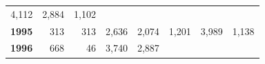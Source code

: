 \documentclass[]{article}
\begin{document}
\begin{longtable}[]{@{}rrrrrrrr@{}}
\begin{minipage}[t]{0.09\columnwidth}
4,112\strut
\end{minipage} & \begin{minipage}[t]{0.08\columnwidth}\raggedleft\strut
2,884\strut
\end{minipage} & \begin{minipage}[t]{0.10\columnwidth}\raggedleft\strut
1,102\strut
\end{minipage}\tabularnewline
\begin{minipage}[t]{0.08\columnwidth}\raggedleft\strut
\textbf{1995}\strut
\end{minipage} & \begin{minipage}[t]{0.10\columnwidth}\raggedleft\strut
313\strut
\end{minipage} & \begin{minipage}[t]{0.11\columnwidth}\raggedleft\strut
313\strut
\end{minipage} & \begin{minipage}[t]{0.08\columnwidth}\raggedleft\strut
2,636\strut
\end{minipage} & \begin{minipage}[t]{0.14\columnwidth}\raggedleft\strut
2,074\strut
\end{minipage} & \begin{minipage}[t]{0.09\columnwidth}\raggedleft\strut
1,201\strut
\end{minipage} & \begin{minipage}[t]{0.08\columnwidth}\raggedleft\strut
3,989\strut
\end{minipage} & \begin{minipage}[t]{0.10\columnwidth}\raggedleft\strut
1,138\strut
\end{minipage}\tabularnewline
\begin{minipage}[t]{0.08\columnwidth}\raggedleft\strut
\textbf{1996}\strut
\end{minipage} & \begin{minipage}[t]{0.10\columnwidth}\raggedleft\strut
668\strut
\end{minipage} & \begin{minipage}[t]{0.11\columnwidth}\raggedleft\strut
46\strut
\end{minipage} & \begin{minipage}[t]{0.08\columnwidth}\raggedleft\strut
3,740\strut
\end{minipage} & \begin{minipage}[t]{0.14\columnwidth}\raggedleft\strut
2,887\strut
\end{minipage} & \begin{minipage}[t]{0.09\columnwidth}\raggedleft\strut

\end{minipage}
\end{longtable}
\end{document}
